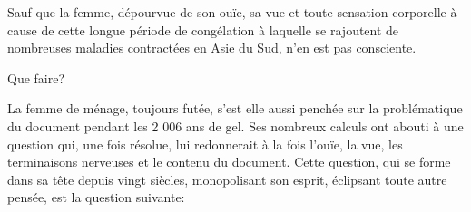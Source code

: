 \documentclass[a4paper]{article}
\begin{document}
Sauf que la femme, dépourvue de son ouïe, sa vue et toute sensation
corporelle à cause de cette longue période de congélation à laquelle se
rajoutent de nombreuses maladies contractées en Asie du Sud, n’en est pas
consciente.

Que faire?

La femme de ménage, toujours futée, s’est elle aussi penchée sur la problématique
du document pendant les 2 006 ans de gel. Ses nombreux calculs ont abouti
à une question qui, une fois résolue, lui redonnerait à la fois l’ouïe, la vue,
les terminaisons nerveuses et le contenu du document. Cette question, qui se
forme dans sa tête depuis vingt siècles, monopolisant son esprit, éclipsant
toute autre pensée, est la question suivante:

\end{document}
